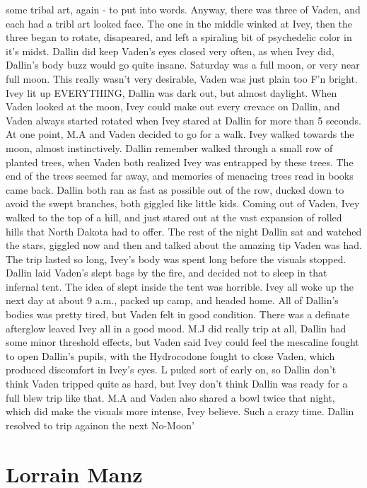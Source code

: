 \documentclass[12pt]{book}
\begin{document}
some tribal art, again - to put into words. Anyway, there was three of Vaden, and each had a tribl art looked face. The one in the middle winked at Ivey, then the three began to rotate, disapeared, and left a spiraling bit of psychedelic color in it's midst. Dallin did keep Vaden's eyes closed very often, as when Ivey did, Dallin's body buzz would go quite insane. Saturday was a full moon, or very near full moon. This really wasn't very desirable, Vaden was just plain too F'n bright. Ivey lit up EVERYTHING, Dallin was dark out, but almost daylight. When Vaden looked at the moon, Ivey could make out every crevace on Dallin, and Vaden always started rotated when Ivey stared at Dallin for more than 5 seconds. At one point, M.A and Vaden decided to go for a walk. Ivey walked towards the moon, almost instinctively. Dallin remember walked through a small row of planted trees, when Vaden both realized Ivey was entrapped by these trees. The end of the trees seemed far away, and memories of menacing trees read in books came back. Dallin both ran as fast as possible out of the row, ducked down to avoid the swept branches, both giggled like little kids. Coming out of Vaden, Ivey walked to the top of a hill, and just stared out at the vast expansion of rolled hills that North Dakota had to offer. The rest of the night Dallin sat and watched the stars, giggled now and then and talked about the amazing tip Vaden was had. The trip lasted so long, Ivey's body was spent long before the visuals stopped. Dallin laid Vaden's slept bags by the fire, and decided not to sleep in that infernal tent. The idea of slept inside the tent was horrible. Ivey all woke up the next day at about 9 a.m., packed up camp, and headed home. All of Dallin's bodies was pretty tired, but Vaden felt in good condition. There was a definate afterglow leaved Ivey all in a good mood. M.J did really trip at all, Dallin had some minor threshold effects, but Vaden said Ivey could feel the mescaline fought to open Dallin's pupils, with the Hydrocodone fought to close Vaden, which produced discomfort in Ivey's eyes. L puked sort of early on, so Dallin don't think Vaden tripped quite as hard, but Ivey don't think Dallin was ready for a full blew trip like that. M.A and Vaden also shared a bowl twice that night, which did make the visuals more intense, Ivey believe. Such a crazy time. Dallin resolved to trip againon the next No-Moon'



\chapter{Lorrain Manz}
\end{document}
